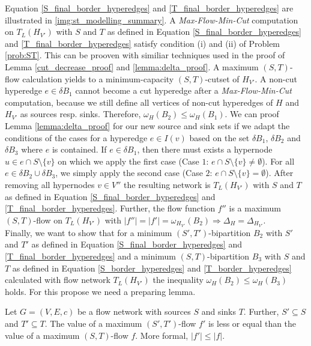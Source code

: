 Equation \ref{S_final_border_hyperedges} and \ref{T_final_border_hyperedges} 
are illustrated in \autoref{img:st_modelling_summary}.
A \emph{Max-Flow-Min-Cut} computation on $T_L(H_{V'})$ with $S$ and $T$ as defined
in Equation \ref{S_final_border_hyperedges} and \ref{T_final_border_hyperedges} satisfy
condition (i) and (ii) of Problem \ref{prob:ST}. This can be prooven with similiar techniques
used in the proof of Lemma \ref{cut_decrease_proof} and \ref{lemma:delta_proof}. A maximum
$(S,T)$-flow calculation yields to a minimum-capacity $(S,T)$-cutset of $H_{V'}$. A non-cut hyperedge
$e \in \delta B_1$ cannot become a cut hyperedge after a \emph{Max-Flow-Min-Cut} computation,
because we still define all vertices of non-cut hyperedges of $H$ and $H_{V'}$ as sources resp. sinks. 
Therefore, $\omega_H(B_2) \le \omega_H(B_1)$. We can proof Lemma \ref{lemma:delta_proof} for our
new source and sink sets if we adapt the conditions of the cases for a hyperedge $e \in I(v)$ 
based on the set $\delta B_1$, $\delta B_2$ and $\delta B_3$ where $e$ is contained. If
$e \in \delta B_1$, then there must exists a hypernode $u \in e \cap S \setminus \{v\}$ on
which we apply the first case (Case $1$: $e \cap S \setminus \{v\} \neq \emptyset$). 
For all $e \in \delta B_2 \cup \delta B_3$, we simply apply the second case
(Case $2$: $e \cap S \setminus \{v\} = \emptyset$). After removing all hypernodes $v \in V''$
the resulting network is $T_L(H_{V'})$ with $S$ and $T$ as defined in Equation
\ref{S_final_border_hyperedges} and \ref{T_final_border_hyperedges}. Further, the flow function
$f''$ is a maximum $(S,T)$-flow on $T_L(H_{V'})$ with $|f''| = |f'| = \omega_{H_{V'}}(B_2)
\Rightarrow \Delta_H = \Delta_{H_{V'}}$. \\
Finally, we want to show that for a minimum $(S',T')$-bipartition $B_2$ with $S'$ and $T'$ as defined
in Equation \ref{S_final_border_hyperedges} and \ref{T_final_border_hyperedges} and a minimum
$(S,T)$-bipartition $B_3$ with $S$ and $T$ as defined in Equation \ref{S_border_hyperedges}
and \ref{T_border_hyperedges} calculated with flow network $T_L(H_{V'})$ the inequality 
$\omega_H(B_2) \le \omega_H(B_3)$ holds. For this propose we need a preparing lemma.

\begin{lemma}
\label{lemma:ST_subset}
Let $G = (V,E,c)$ be a flow network with sources $S$ and sinks $T$. Further, $S' \subseteq S$
and $T' \subseteq T$. The value of a maximum $(S',T')$-flow $f'$ is less or equal than the value
of a maximum $(S,T)$-flow $f$. More formal, $|f'| \le |f|$.
\end{lemma}

